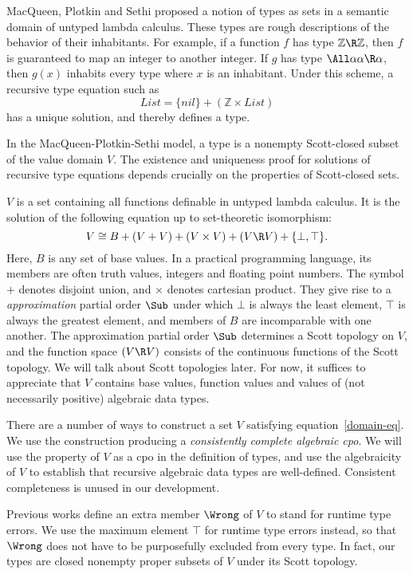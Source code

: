 \documentclass{amsart}
\begin{document}
MacQueen, Plotkin and Sethi proposed a notion of types as sets in
a semantic domain of untyped lambda calculus. These types are
rough descriptions of the behavior of their inhabitants. For
example, if a function $f$ has type $\mathbb Z\R\mathbb Z$, then
$f$ is guaranteed to map an integer to another integer. If $g$
has type $\All\alpha \alpha\R\alpha$, then $g(x)$ inhabits every
type where $x$ is an inhabitant. Under this scheme, a recursive
type equation such as
\[
\mathit{List} = \{\mathit{nil}\} + (\mathbb Z \times \mathit{List})
\]
has a unique solution, and thereby defines a type.

In the MacQueen-Plotkin-Sethi model, a type is a nonempty
Scott-closed subset of the value domain $V$. The existence and
uniqueness proof for solutions of recursive type equations
depends crucially on the properties of Scott-closed sets.



$V$ is a set containing all functions definable in untyped lambda
calculus. It is the solution of the following equation up to
set-theoretic isomorphism:
\begin{equation}\label{domain-eq}
V \cong B + (V + V) + (V \times V) + (V \R V) + \{\bot, \top\}.
\end{equation}
Here, $B$ is any set of base values. In a practical programming
language, its members are often truth values, integers and
floating point numbers. The symbol $+$ denotes disjoint union,
and $\times$ denotes cartesian product. They give rise to a
\emph{approximation} partial order $\Sub$ under which $\bot$ is
always the least element, $\top$ is always the greatest element,
and members of $B$ are incomparable with one another. The
approximation partial order $\Sub$ determines a Scott topology on
$V$, and the function space $(V \R V)$ consists of the continuous
functions of the Scott topology. We will talk about Scott
topologies later. For now, it suffices to appreciate that $V$
contains base values, function values and values of (not
necessarily positive) algebraic data types.

There are a number of ways to construct a set $V$ satisfying
equation~\eqref{domain-eq}. We use the construction producing a
\emph{consistently complete algebraic cpo}. We will use the
property of $V$ as a cpo in the definition of types, and use the
algebraicity of $V$ to establish that recursive algebraic data
types are well-defined. Consistent completeness is unused in our
development.

Previous works define an extra member $\Wrong$ of $V$ to stand
for runtime type errors. We use the maximum element $\top$ for
runtime type errors instead, so that $\Wrong$ does not have to be
purposefully excluded from every type. In fact, our types are
closed nonempty proper subsets of $V$ under its Scott topology.
\end{document}
